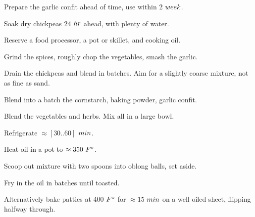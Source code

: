 \begin{preparation}
\item Prepare the garlic confit ahead of time, use within 2 $\week$.

\item Soak dry chickpeas 24 $\hour$ ahead, with plenty of water.

\item Reserve a food processor, a pot or skillet, and cooking oil.

\item Grind the spices, roughly chop the vegetables, smash the garlic.

\item Drain the chickpeas and blend in batches. Aim for a slightly coarse mixture, not as fine as sand.

\item Blend into a batch the cornstarch, baking powder, garlic confit.

\item Blend the vegetables and herbs. Mix all in a large bowl.

\item Refrigerate $\approx [30 .. 60]$ $\minute$.

\item Heat oil in a pot to $\approx 350~\Fahrenheit$.

\item Scoop out mixture with two spoons into oblong balls, set aside.

\item Fry in the oil in batches until toasted.

\end{preparation}


\begin{variation}
\item Alternatively bake patties at 400 $\Fahrenheit$ for $\approx 15$ $\minute$ on a well oiled sheet, flipping halfway through.

\end{variation}


\recipeend%
